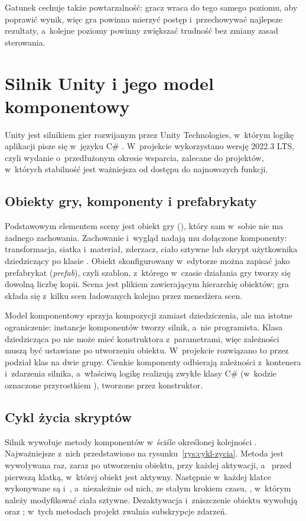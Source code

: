 Gatunek cechuje także powtarzalność: gracz wraca do tego samego poziomu, aby poprawić
wynik, więc gra powinna mierzyć postęp i~przechowywać najlepsze rezultaty, a~kolejne
poziomy powinny zwiększać trudność bez zmiany zasad sterowania.

\section{Silnik Unity i jego model komponentowy}

Unity jest silnikiem gier rozwijanym przez Unity Technologies, w~którym logikę aplikacji
pisze się w~języku C\# \cite{unity-manual}. W~projekcie wykorzystano wersję 2022.3 LTS,
czyli wydanie o~przedłużonym okresie wsparcia, zalecane do projektów, w~których
stabilność jest ważniejsza od dostępu do najnowszych funkcji.

\subsection{Obiekty gry, komponenty i prefabrykaty}

Podstawowym elementem sceny jest obiekt gry (), który sam w~sobie nie ma
żadnego zachowania. Zachowanie i~wygląd nadają mu dołączone komponenty: transformacja,
siatka i~materiał, zderzacz, ciało sztywne lub skrypt użytkownika dziedziczący po klasie
. Obiekt skonfigurowany w~edytorze można zapisać jako prefabrykat
(\emph{prefab}), czyli szablon, z~którego w~czasie działania gry tworzy się dowolną liczbę
kopii. Scena jest plikiem zawierającym hierarchię obiektów; gra składa się z~kilku scen
ładowanych kolejno przez menedżera scen.

Model komponentowy sprzyja kompozycji zamiast dziedziczenia, ale ma istotne ograniczenie:
instancje komponentów tworzy silnik, a~nie programista. Klasa dziedzicząca po
 nie może mieć konstruktora z~parametrami, więc zależności muszą być
ustawiane po utworzeniu obiektu. W~projekcie rozwiązano to przez podział klas na dwie
grupy. Cienkie komponenty  odbierają zależności z~kontenera i~zdarzenia
silnika, a~właściwą logikę realizują zwykłe klasy C\# (w~kodzie oznaczone przyrostkiem
), tworzone przez konstruktor.

\subsection{Cykl życia skryptów}

Silnik wywołuje metody komponentów w~ściśle określonej kolejności \cite{unity-order}.
Najważniejsze z~nich przedstawiono na rysunku~\ref{rys:cykl-zycia}. Metoda 
jest wywoływana raz, zaraz po utworzeniu obiektu,  przy każdej aktywacji,
a~ przed pierwszą klatką, w~której obiekt jest aktywny. Następnie w~każdej
klatce wykonywane są  i~, a~niezależnie od nich, ze stałym
krokiem czasu, , w~którym należy modyfikować ciała sztywne. Dezaktywacja
i~zniszczenie obiektu wywołują  oraz ; w~tych metodach
projekt zwalnia subskrypcje zdarzeń.

